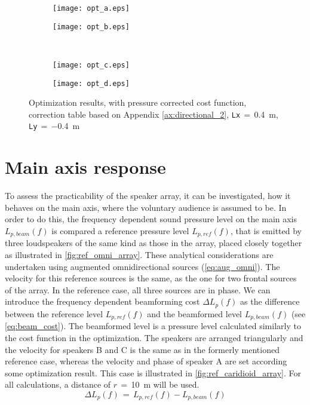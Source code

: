 \begin{figure}[H]
\begin{subfigure}[c]{0.5\textwidth}
\texttt{[image: opt\_a.eps]}
\label{fig:opt_res_a}
\end{subfigure}
\begin{subfigure}[c]{0.5\textwidth}
\texttt{[image: opt\_b.eps]}
\label{fig:opt_res_b}
\end{subfigure}\\
\hspace{0.1\textheight}
\begin{subfigure}[c]{0.5\textwidth}
\texttt{[image: opt\_c.eps]}
\label{fig:opt_res_c}
\end{subfigure}
\begin{subfigure}[c]{0.5\textwidth}
\texttt{[image: opt\_d.eps]}
\label{fig:opt_res_d}
\end{subfigure}
\caption{Optimization results, with pressure corrected cost function, correction table based on Appendix \ref{ax:directional_2}, \textcolor{green3}{\texttt{Lx}}\,$=$\,\SI{0.4}{\meter}, \textcolor{green3}{\texttt{Ly}}\,$=\,$\SI{-0.4}{\meter}}
		\label{fig:opt_res}
\end{figure}

\section{Main axis response}\label{sec:main_axis}
To assess the practicability of the speaker array, it can be investigated, how it behaves on the main axis, where the voluntary audience is assumed to be. In order to do this, the frequency dependent sound pressure level on the main axis $L_{p,beam}(f)$ is compared a reference pressure level $L_{p,ref}(f)$, that is emitted by three loudspeakers of the same kind as those in the array, placed closely together as illustrated in \autoref{fig:ref_omni_array}. These analytical considerations are undertaken using augmented omnidirectional sources (\autoref{eq:aug_omni}). The velocity for this reference sources is the same, as the one for two frontal sources of the array. In the reference case, all three sources are in phase.
We can introduce the frequency dependent beamforming cost $\Delta L_{p}(f)$ as the difference between the reference level $L_{p,ref}(f)$ and the beamformed level $L_{p,beam}(f)$ (see \autoref{eq:beam_cost}).  The beamformed level is a pressure level calculated similarly to the cost function in the optimization. The speakers are arranged triangularly and the velocity for speakers B and C is the same as in the formerly mentioned reference case, whereas the velocity and phase of speaker A are set according some optimization result. This case is illustrated in \autoref{fig:ref_caridioid_array}. For all calculations, a distance of $r\,=\,$\SI{10}{\meter} will be used.
\begin{equation}\label{eq:beam_cost}
\Delta L_{p}(f)\,=\,L_{p,ref}(f)-L_{p,beam}(f)
\end{equation}

